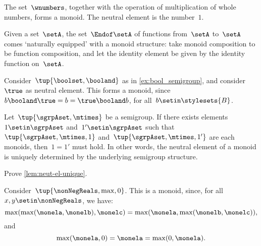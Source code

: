\begin{example}
    The set~$\wnumbers$, together with the operation of multiplication of whole numbers, forms a monoid.
    The neutral element is the number~$1$.
\end{example}

\begin{example}
    Given a set~$\setA$, the set~$\Endof\setA$ of functions from~$\setA$ to~$\setA$ comes `naturally equipped' with a monoid structure: take monoid composition to be function composition, and let the identity element be given by the identity function on~$\setA$.
\end{example}

\begin{example}
    \label{ex:bool_monoid}
    Consider~$\tup{\boolset,\booland}$ as in \cref{ex:bool_semigroup}, and consider~$\true$ as neutral element.
    This forms a monoid, since~$b\booland \true=b=\true \booland b$, for all~$b\setin \stylesets{B}$.
\end{example}

\begin{lemma}
    \label{lem:neut-el-unique}
    Let~$\tup{\sgrpAset, \mtimes}$ be a semigroup.
    If there exists elements~$1 \setin \sgrpAset$ and~$1' \setin \sgrpAset$ such that~$\tup{\sgrpAset, \mtimes, 1}$ and~$\tup{\sgrpAset, \mtimes, 1'}$ are each monoids, then~$1 = 1'$ must hold.
    In other words, the neutral element of a monoid is uniquely determined by the underlying semigroup structure.
\end{lemma}

\begin{gradedexercise}
    \label{ex:UniqueNeutralMonoid}
    Prove \cref{lem:neut-el-unique}.
\end{gradedexercise}


\begin{example}
    Consider~$\tup{\nonNegReals,\max,0}$.
    This is a monoid, since, for all~$x,y\setin \nonNegReals$, we have:
    \begin{equation}
        \max(\max(\monela,\monelb),\monelc)=\max(\monela,\max(\monelb,\monelc)),
    \end{equation}
    and
    \begin{equation}
        \max(\monela,0)=\monela=\max(0,\monela).
    \end{equation}
\end{example}


